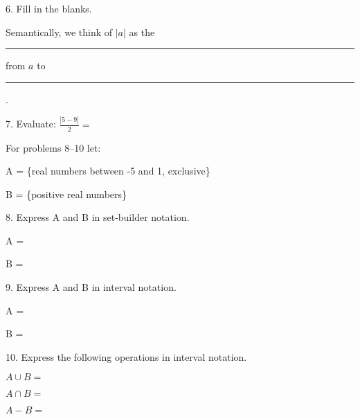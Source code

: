 \documentclass[letterpaper, 12pt]{article}
\begin{document}
\vspace{0.5in}

6. Fill in the blanks.

\bigskip

Semantically, we think of $|a|$ as the \rule{1in}{1pt} from $a$ to
\rule{0.5in}{1pt}.

\vspace{0.5in}

7. Evaluate: $\frac{|5-9|}{2} = $

\pagebreak

For problems 8--10 let:

\bigskip

A = \{real numbers between -5 and 1, exclusive\}

B = \{positive real numbers\}

\vspace{0.5in}

8. Express A and B in set-builder notation.

\bigskip

A = 

\bigskip

B =

\vspace{0.5in}

9. Express A and B in interval notation.

\bigskip

A =

\bigskip

B =

\vspace{0.5in}

10. Express the following operations in interval notation.

\bigskip

$A \cup B = $

\bigskip

$A \cap B = $

\bigskip

$A - B = $
\end{document}
